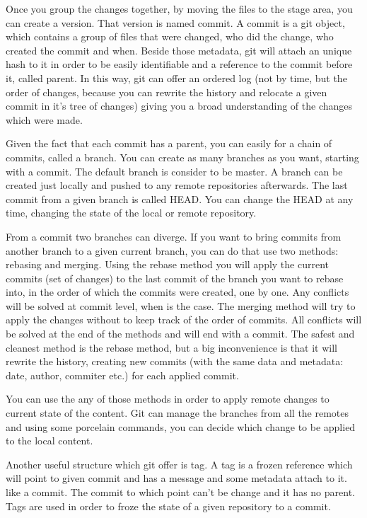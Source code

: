         Once you group the changes together, by moving the files to the stage area, you can create a version. That version is named commit. A commit is a git object, which contains a group of files that were changed, who did the change, who created the commit and when. Beside those metadata, git will attach an unique hash to it in order to be easily identifiable and a reference to the commit before it, called parent. In this way, git can offer an ordered log (not by time, but the order of changes, because you can rewrite the history and relocate a given commit in it's tree of changes) giving you a broad understanding of the changes which were made.
        
        Given the fact that each commit has a parent, you can easily for a chain of commits, called a branch. You can create as many branches as you want, starting with a commit. The default branch is consider to be master. A branch can be created just locally and pushed to any remote repositories afterwards. The last commit from a given branch is called HEAD.
        You can change the HEAD at any time, changing the state of the local or remote repository.
        
        From a commit two branches can diverge. If you want to bring commits from another branch to a given current branch, you can do that use two methods: rebasing and merging.
        Using the rebase method you will apply the current commits (set of changes) to the last commit of the branch you want to rebase into, in the order of which the commits were created, one by one. Any conflicts will be solved at commit level, when is the case. 
        The merging method will try to apply the changes without to keep track of the order of commits. All conflicts will be solved at the end of the methods and will end with a commit. The safest and cleanest method is the rebase method, but a big inconvenience is that it will rewrite the history, creating new commits (with the same data and metadata: date, author, commiter etc.) for each applied commit.
        
        You can use the any of those methods in order to apply remote changes to current state of the content. Git can manage the branches from all the remotes and using some porcelain commands, you can decide which change to be applied to the local content.
        
        Another useful structure which git offer is tag. A tag is a frozen reference which will point to given commit and has a message and some metadata attach to it. like a commit. The commit to which point can't be change and it has no parent. Tags are used in order to froze the state of a given repository to a commit. 
        
